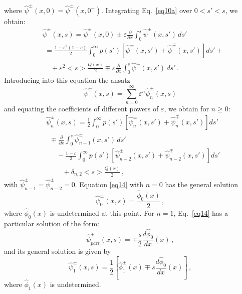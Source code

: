 \documentclass{anstrans}
\newcommand{\bl}{\big<}
\newcommand{\bg}{\big>}
\newcommand{\eps}{\varepsilon}
\begin{document}
where $\hat\psi^\pm(x,0) = \hat\psi^\pm(x,0^+)$. Integrating Eq.\ \eqref{eq10a} over $0 < s' < s$, we obtain:
   \begin{align}
      &\hat\psi^\pm( x, s)  = \hat\psi^\pm(x, 0) \pm \varepsilon \frac{\partial}{\partial x} \int_0^s \hat\psi^\pm(x, s') \, ds' \\
      & \,\, = \frac{1-\eps^2(1-c)}{2} \int_0^{\infty} p(s')
\left[\hat\psi^\pm(x,s')+\hat\psi^\mp(x, s')\right] ds' + \nonumber\\
         &\,\,\,\,\,\,\, + \varepsilon^2 \bl s\bg \frac{Q(x)}{2} \mp \varepsilon\frac{\partial}{\partial x} \int_0^s \hat\psi^\pm(x, s') \, ds' \,.\nonumber
   \end{align}
Introducing into this equation the ansatz 
   \begin{equation}
 \hat\psi^\pm(x, s) =  \sum_{n=0}^{\infty} \varepsilon^n
       \hat\psi_n^\pm(x, s) 
       \end{equation}
and equating the coefficients of different powers of $\varepsilon$, we obtain for $n \ge 0$:
   \begin{align}
&      \hat\psi_n^\pm(x, s)  = \frac{1}{2}\int_0^{\infty} p(s')\left[
\hat\psi_n^\pm(x, s')+\hat\psi_n^\mp(x,s')\right] ds' \label{eq14}\\
&\,\,\, \mp \frac{\partial}{\partial x} \int_0^s \hat\psi_{n-1}^\pm(x, s') \, ds' \nonumber \\
& \,\,\,\,\,\,\,\,\, -\frac{1-c}{2}\int_0^{\infty} p(s')\left[
\hat\psi_{n-2}^\pm(x, s')+\hat\psi_{n-2}^\mp(x,s')\right] ds'  \nonumber\\   
      & \,\,\,\,\,\,\,\,\,\,\,\,\,\,+ \delta_{n,2} \bl s\bg \frac{Q( x)}{2} \,, 
   \nonumber
   \end{align}
with $\hat\psi_{n-1}^\pm=\hat\psi_{n-2}^\pm=0$. Equation \eqref{eq14} with $n=0$ has the general solution
   \begin{equation}
      \hat\psi_0^\pm(x, s) = \frac{\hat\phi_0(x)}{2} \,,
   \end{equation}
where $\hat\phi_0(x)$ is undetermined at this point. For $n=1$,
Eq.\ \eqref{eq14} has a particular solution of the form:
    \begin{equation}
      \hat\psi_{part}^\pm(x,s) = \mp \frac{s}{2}\frac{d \hat\phi_0}{d x}(x) \,,
   \end{equation}   
and its general solution is given by 
   \begin{equation}
      \hat\psi_1^\pm( x, s) =  \frac{1}{2}\left[\hat\phi_1^\pm( x) \mp s\frac{d \hat\phi_0}{d x}(x)\right] \,,
   \label{eq17}
  \end{equation}  
where $\hat\phi_1(x)$ is undetermined.
\end{document}
